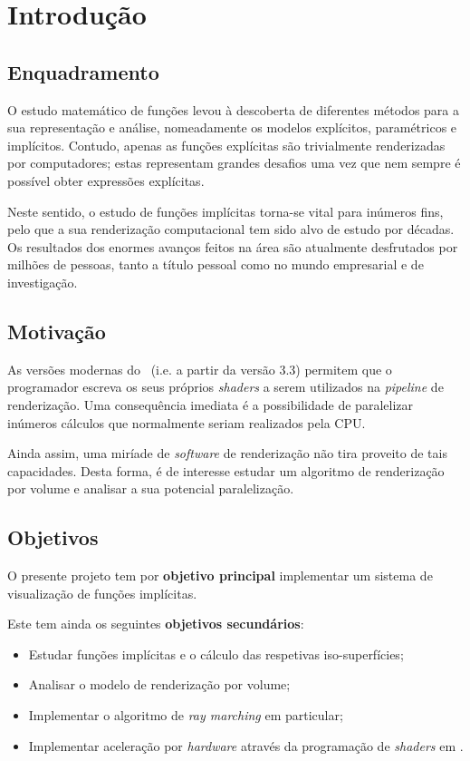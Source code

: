 \chapter{Introdução}
\label{ch::intro}

\section{Enquadramento}
\label{sec::intro:enquadramento}

O estudo matemático de funções levou à descoberta de diferentes métodos para a sua representação e análise, nomeadamente os modelos explícitos, paramétricos e implícitos. Contudo, apenas as funções explícitas são trivialmente renderizadas por computadores; estas representam grandes desafios uma vez que nem sempre é possível obter expressões explícitas.

Neste sentido, o estudo de funções implícitas torna-se vital para inúmeros fins, pelo que a sua renderização computacional tem sido alvo de estudo por décadas. Os resultados dos enormes avanços feitos na área são atualmente desfrutados por milhões de pessoas, tanto a título pessoal como no mundo empresarial e de investigação.


\section{Motivação}
\label{sec::intro:motivacao}

As versões modernas do \opengl~(i.e. a partir da versão 3.3) permitem que o programador escreva os seus próprios \textit{shaders} a serem utilizados na \textit{pipeline} de renderização. Uma consequência imediata é a possibilidade de paralelizar inúmeros cálculos que normalmente seriam realizados pela \ac{CPU}.

Ainda assim, uma miríade de \textit{software} de renderização não tira proveito de tais capacidades. Desta forma, é de interesse estudar um algoritmo de renderização por volume e analisar a sua potencial paralelização.


\section{Objetivos}
\label{sec::intro:objetivos}

O presente projeto tem por \textbf{objetivo principal} implementar um sistema de visualização de funções implícitas.

Este tem ainda os seguintes \textbf{objetivos secundários}:
\begin{itemize}
	\item Estudar funções implícitas e o cálculo das respetivas iso-superfícies;
	\item Analisar o modelo de renderização por volume;
	\item Implementar o algoritmo de \textit{ray marching} em particular;
	\item Implementar aceleração por \textit{hardware} através da programação de \emph{shaders} em \opengl.
\end{itemize}


